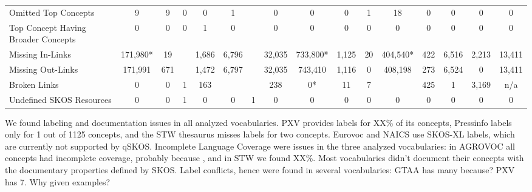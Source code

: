 \begin{table}[h]
\begin{center}
{\begin{tabular}{p{4cm}ccccccccccccccc}
Omitted Top Concepts & 9 & 9 & 0 & 0 & 1 && 0 & 0 & 0 & 1 & 18 & 0 & 0 & 0 & 0 \\

Top Concept Having Broader Concepts & 0 & 0 & 0 & 1 & 0 && 0 & 0 & 0 & 0 & 0 & 0 & 0 & 0 & 0 \\

\midrule

Missing In-Links & 171,980* & 19 && 1,686 & 6,796 && 32,035 & 733,800* & 1,125 & 20 & 404,540* & 422 & 6,516 & 2,213 & 13,411 \\

Missing Out-Links & 171,991 & 671 && 1,472 & 6,797 && 32,035 & 743,410 & 1,116 & 0 & 408,198 & 273 & 6,524 & 0 & 13,411 \\

Broken Links & 0 & 0 & 1 & 163 &&& 238 & 0* & 11 & 7 && 425 & 1 & 3,169 & n/a \\


Undefined SKOS Resources & 0 & 0 & 1 & 0 & 0 & 1 & 0 & 0 & 0 & 0 & 0 & 0 & 0 & 0 & 0  \\

\bottomrule
\end{tabular}
}
\end{center}
\end{table}

We found labeling and documentation issues in all analyzed vocabularies. PXV provides labels for XX\% of its concepts, Pressinfo labels only for 1 out of 1125 concepts, and the STW thesaurus misses labels for two concepts. Eurovoc and NAICS use SKOS-XL labels, which are currently not supported by qSKOS.
Incomplete Language Coverage were issues in the three analyzed vocabularies: in AGROVOC all concepts had incomplete coverage, probably because , and in STW we found XX\%.
Most vocabularies didn't document their concepts with the documentary properties defined by SKOS.
Label conflicts, hence  were found in several vocabularies: GTAA has many because? PXV has 7. Why given examples?





% 
